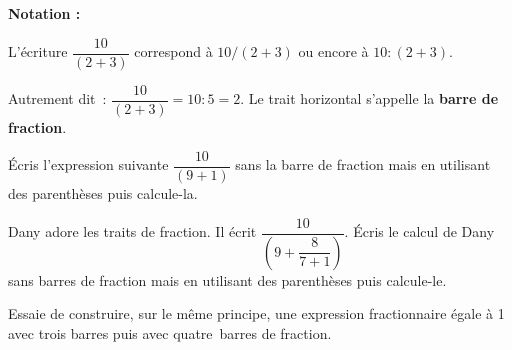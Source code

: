 
\begin{activite}

\textbf{Notation :}

L’écriture $\dfrac{10}{(2 + 3)}$ correspond à $10 / (2 + 3)$ ou encore à $10 : (2 + 3)$.

Autrement dit : $\dfrac{10}{(2 + 3)} = 10 : 5 = 2$. Le trait horizontal s'appelle la \textbf{barre de fraction}.

\begin{partie}
Écris l'expression suivante $\dfrac{10}{(9 + 1)}$ sans la barre de fraction mais en utilisant des parenthèses puis calcule-la.\dotfill
\end{partie}


\begin{partie}
Dany adore les traits de fraction. Il écrit $\dfrac{10}{\left(9 + \dfrac{8}{7+1}\right)}$. Écris le calcul de Dany sans barres de fraction mais en utilisant des parenthèses puis calcule-le. \dotfill

\dotfill
\end{partie}


\begin{partie}
Essaie de construire, sur le même principe, une expression fractionnaire égale à 1 avec trois barres puis avec quatre barres de fraction.
\end{partie}

\end{activite}



